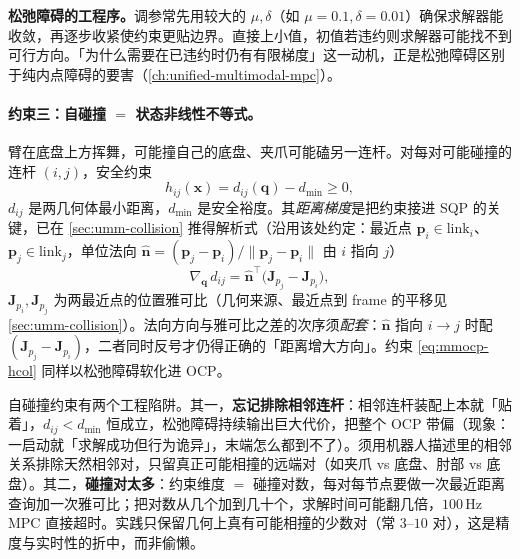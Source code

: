 \begin{note}
\textbf{松弛障碍的工程序。}\;调参常先用较大的 $\mu,\delta$（如 $\mu=0.1,\delta=0.01$）确保求解器能收敛，再逐步收紧使约束更贴边界。直接上小值，初值若违约则求解器可能找不到可行方向。「为什么需要在已违约时仍有有限梯度」这一动机，正是松弛障碍区别于纯内点障碍的要害（\cref{ch:unified-multimodal-mpc}）。
\end{note}

\paragraph{约束三：自碰撞 $=$ 状态非线性不等式。}
臂在底盘上方挥舞，可能撞自己的底盘、夹爪可能磕另一连杆。对每对可能碰撞的连杆 $(i,j)$，安全约束
\begin{equation}
  h_{ij}(\mathbf x)=d_{ij}(\mathbf q)-d_{\min}\ge0,
  \label{eq:mmocp-hcol}
\end{equation}
$d_{ij}$ 是两几何体最小距离，$d_{\min}$ 是安全裕度。其\emph{距离梯度}是把约束接进 SQP 的关键，已在 \cref{sec:umm-collision} 推得解析式（沿用该处约定：最近点 $\mathbf p_i\in\mathrm{link}_i$、$\mathbf p_j\in\mathrm{link}_j$，单位法向 $\hat{\mathbf n}=(\mathbf p_j-\mathbf p_i)/\|\mathbf p_j-\mathbf p_i\|$ 由 $i$ 指向 $j$）
\begin{equation}
  \nabla_{\mathbf q}\,d_{ij}=\hat{\mathbf n}^\top\big(\mathbf J_{p_j}-\mathbf J_{p_i}\big),
  \label{eq:mmocp-ddq}
\end{equation}
$\mathbf J_{p_i},\mathbf J_{p_j}$ 为两最近点的位置雅可比（几何来源、最近点到 frame 的平移见 \cref{sec:umm-collision}）。法向方向与雅可比之差的次序须\emph{配套}：$\hat{\mathbf n}$ 指向 $i\!\to\!j$ 时配 $(\mathbf J_{p_j}-\mathbf J_{p_i})$，二者同时反号才仍得正确的「距离增大方向」。约束 \cref{eq:mmocp-hcol} 同样以松弛障碍软化进 OCP。

\begin{pitfall}
自碰撞约束有两个工程陷阱。其一，\textbf{忘记排除相邻连杆}：相邻连杆装配上本就「贴着」，$d_{ij}<d_{\min}$ 恒成立，松弛障碍持续输出巨大代价，把整个 OCP 带偏（现象：一启动就「求解成功但行为诡异」，末端怎么都到不了）。须用机器人描述里的相邻关系排除天然相邻对，只留真正可能相撞的远端对（如夹爪 vs 底盘、肘部 vs 底盘）。其二，\textbf{碰撞对太多}：约束维度 $=$ 碰撞对数，每对每节点要做一次最近距离查询加一次雅可比；把对数从几个加到几十个，求解时间可能翻几倍，$100\,\mathrm{Hz}$ MPC 直接超时。实践只保留几何上真有可能相撞的少数对（常 $3$--$10$ 对），这是精度与实时性的折中，而非偷懒。
\end{pitfall}

